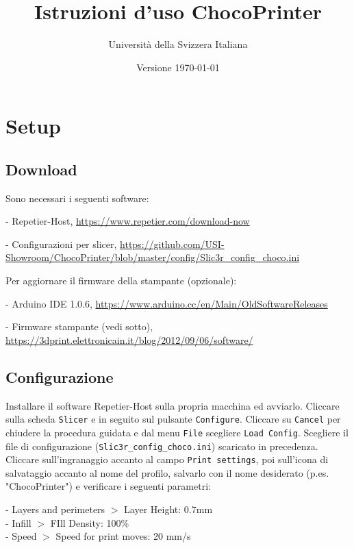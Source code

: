 \documentclass[12pt]{article}
\title{Istruzioni d'uso ChocoPrinter}
\author{Università della Svizzera Italiana}
\date{Versione \today}
\begin{document}
\maketitle
\tableofcontents
\newpage

\section{Setup}

	\subsection{Download}\label{sec:download}

		Sono necessari i seguenti software:

		- Repetier-Host, \url{https://www.repetier.com/download-now}

		- Configurazioni per slicer, \url{https://github.com/USI-Showroom/ChocoPrinter/blob/master/config/Slic3r_config_choco.ini}

		Per aggiornare il firmware della stampante (opzionale):

		- Arduino IDE 1.0.6, \url{https://www.arduino.cc/en/Main/OldSoftwareReleases}

		- Firmware stampante (vedi sotto), \url{https://3dprint.elettronicain.it/blog/2012/09/06/software/}
		
		
	\subsection{Configurazione}\label{config}
	
		Installare il software Repetier-Host sulla propria macchina ed avviarlo. Cliccare sulla scheda \texttt{Slicer} e in seguito sul pulsante \texttt{Configure}. Cliccare su \texttt{Cancel} per chiudere la procedura guidata e dal menu \texttt{File} scegliere \texttt{Load Config}. Scegliere il file di configurazione (\texttt{Slic3r\_config\_choco.ini}) scaricato in precedenza.\\
		Cliccare sull'ingranaggio accanto al campo \texttt{Print settings}, poi sull'icona di salvataggio accanto al nome del profilo, salvarlo con il nome desiderato (p.es. "ChocoPrinter") e verificare i seguenti parametri:
		
		- Layers and perimeters $>$ Layer Height: 0.7mm\\
		- Infill $>$ FIll Density: 100\%\\
		- Speed $>$ Speed for print moves: 20 mm/s\\
		
\end{document}
